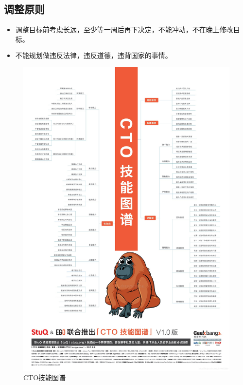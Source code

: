 \documentclass{article}
\begin{document}
\subsection{调整原则}
\begin{itemize}
	\item 调整目标前考虑长远，至少等一周后再下决定，不能冲动，不在晚上修改目标。
	\item 不能规划做违反法律，违反道德，违背国家的事情。
\end{itemize}
\begin{figure}[H]
	\centering
	\includegraphics[width=1\linewidth]{skillmap}
	\caption{CTO技能图谱}
	\label{fig:skillmap}
\end{figure}
\end{document}
